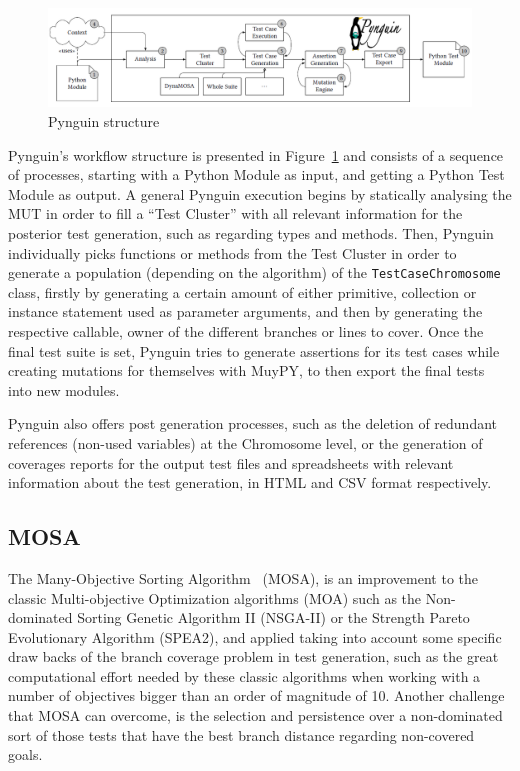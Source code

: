 \documentclass[%
  chapterprefix=false,%
  open=right,%
  twoside=true,%
  paper=a4,%
  logofile={Figures/logo.png},%
  thesistype=master,%
  UKenglish,%
]{se2thesis}
\newcommand{\classname}[1]{\texttt{#1}}
\begin{document}
\begin{figure}[tb]
  \centering
  \includegraphics[width=.99\textwidth]{Figures/pynguin.png}
  \caption{Pynguin structure~\cite{DBLP:conf/icse/LukasczykF22}}\label{fig:pyn}
\end{figure}

Pynguin's workflow structure is presented in Figure~\ref{fig:pyn} and consists of a sequence of processes, starting with a Python Module as input, and getting a Python Test Module as output.
A general Pynguin execution begins by statically analysing the MUT in order to fill a ``Test Cluster'' with all relevant information for the posterior test generation, such as regarding types and methods.
Then, Pynguin individually picks functions or methods from the Test Cluster in order to generate a population (depending on the algorithm) of the \classname{TestCaseChromosome} class, firstly by generating a certain amount of either primitive, collection or instance statement used as parameter arguments, and then by generating the respective callable, owner of the different branches or lines to cover.
Once the final test suite is set, Pynguin tries to generate assertions for its test cases while creating mutations for themselves with MuyPY, to then export the final tests into new modules.

Pynguin also offers post generation processes, such as the deletion of redundant references (non-used variables) at the Chromosome level, or the generation of coverages reports for the output test files and spreadsheets with relevant information about the test generation, in HTML and CSV format respectively.

\newpage
\subsection{MOSA}

The Many-Objective Sorting Algorithm~\cite{DBLP:conf/icst/PanichellaKT15} (MOSA), is an improvement to the classic Multi-objective Optimization algorithms (MOA) such as the Non-dominated Sorting Genetic Algorithm II (NSGA-II) or the Strength Pareto Evolutionary Algorithm (SPEA2), and applied taking into account some specific draw backs of the branch coverage problem in test generation, such as the great computational effort needed by these classic algorithms when working with a number of objectives bigger than an order of magnitude of 10.
Another challenge that MOSA can overcome, is the selection and persistence over a non-dominated sort of those tests that have the best branch distance regarding non-covered goals.
\end{document}
